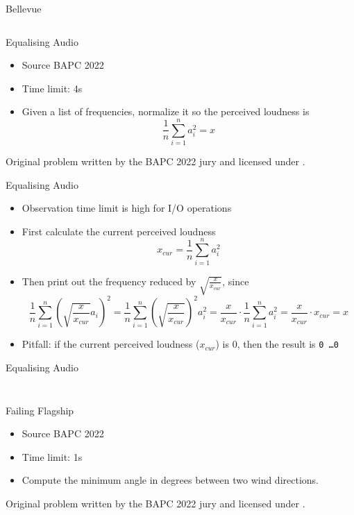 \documentclass[11pt,pdf, aspectratio=169]{beamer}
\begin{document}
  \begin{frame}[containsverbatim]{Bellevue}
    \inputminted{python}{code/session-1/python/bapc-b.py}
  \end{frame}
  \begin{frame}{Equalising Audio}
    \begin{itemize}
      \item Source BAPC 2022
      \item Time limit: 4s
      \item  Given a list of frequencies, normalize it so the perceived loudness is \[\frac{1}{n} \sum^n_{i=1}a_i^2=x\]
    \end{itemize}
    Original problem written by the BAPC 2022 jury and licensed under \doclicenseLongNameRef.
    \doclicenseImage
  \end{frame}
  \begin{frame}{Equalising Audio}
    \begin{itemize}
      \item Observation time limit is high for I/O operations
      \item First calculate the current perceived loudness \[x_{cur} = \frac{1}{n} \sum^n_{i=1}a_i^2\]
      \item Then print out the frequency reduced by $\sqrt{\frac{x}{x_{cur}}}$, since
      \[\frac{1}{n} \sum^n_{i=1}\left(\sqrt{\frac{x}{x_{cur}}}a_i\right)^2 = \frac{1}{n} \sum^n_{i=1}\left(\sqrt{\frac{x}{x_{cur}}}\right)^2a_i^2 = \frac{x}{x_{cur}}\cdot \frac{1}{n}\sum^n_{i=1}a_i^2 = \frac{x}{x_{cur}}\cdot x_{cur} = x\]
      \item Pitfall: if the current perceived loudness ($x_{cur}$) is 0, then the result is \texttt{0 \ldots 0}
    \end{itemize}
  \end{frame}
  \begin{frame}[containsverbatim]{ Equalising Audio}
    \inputminted{python}{code/session-1/python/bapc-e.py}
    \inputminted{kotlin}{code/session-1/kotlin/bapc-e.kt}
  \end{frame}
  \begin{frame}{Failing Flagship}
    \begin{itemize}
      \item Source BAPC 2022
      \item Time limit: 1s
      \item  Compute the minimum angle in degrees between two wind directions.
    \end{itemize}
    Original problem written by the BAPC 2022 jury and licensed under \doclicenseLongNameRef.
    \doclicenseImage
  \end{frame}
\end{document}

